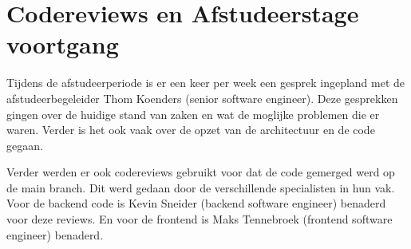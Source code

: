 \section{Codereviews en Afstudeerstage voortgang}
\label{section:CodereviewsEnStageVoortgang}
Tijdens de afstudeerperiode is er een keer per week een gesprek ingepland met de afstudeerbegeleider Thom Koenders (senior software engineer).
Deze gesprekken gingen over de huidige stand van zaken en wat de moglijke problemen die er waren.
Verder is het ook vaak over de opzet van de architectuur en de code gegaan.

\whitespace
Verder werden er ook codereviews gebruikt voor dat de code gemerged werd op de main branch.
Dit werd gedaan door de verschillende specialisten in hun vak.
Voor de backend code is Kevin Sneider (backend software engineer) benaderd voor deze reviews.
En voor de frontend is Maks Tennebroek (frontend software engineer) benaderd.
